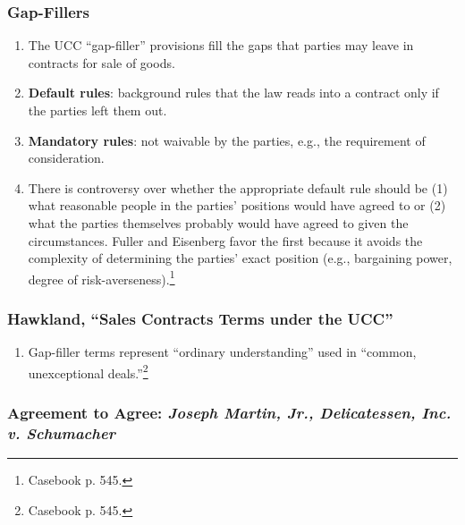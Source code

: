 \subsubsection{Gap-Fillers}

\begin{enumerate}
    \item The UCC ``gap-filler'' provisions fill the gaps that parties may 
    leave in contracts for sale of goods.
    \item \textbf{Default rules}: background rules that the law reads into a 
    contract only if the parties left them out.
    \item \textbf{Mandatory rules}: not waivable by the parties, e.g., the 
    requirement of consideration.
    \item There is controversy over whether the appropriate default rule 
    should be (1) what reasonable people in the parties' positions would have 
    agreed to or (2) what the parties themselves probably would have agreed to 
    given the circumstances. Fuller and Eisenberg favor the first because it 
    avoids the complexity of determining the parties' exact position (e.g., 
    bargaining power, degree of risk-averseness).\footnote{Casebook p. 545.}
\end{enumerate}

\subsubsection{Hawkland, ``Sales Contracts Terms under the UCC''}

\begin{enumerate}
    \item Gap-filler terms represent ``ordinary understanding'' used in 
    ``common, unexceptional deals.''\footnote{Casebook p. 545.}
\end{enumerate}

\subsubsection{Agreement to Agree: \emph{Joseph Martin, Jr., Delicatessen, 
Inc. v. Schumacher}}

